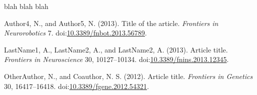 \documentclass{frontiersSCNS} %
\begin{document}
blah blah blah

Author4, N., and Author5, N. (2013). Title of the article.
\emph{Frontiers in Neurorobotics} 7.
doi:\href{http://dx.doi.org/10.3389/fnbot.2013.56789}{10.3389/fnbot.2013.56789}.

LastName1, A., LastName2, A., and LastName2, A. (2013). Article title.
\emph{Frontiers in Neuroscience} 30, 10127--10134.
doi:\href{http://dx.doi.org/10.3389/fnins.2013.12345}{10.3389/fnins.2013.12345}.

OtherAuthor, N., and Coauthor, N. S. (2012). Article title.
\emph{Frontiers in Genetics} 30, 16417--16418.
doi:\href{http://dx.doi.org/10.3389/fgene.2012.54321}{10.3389/fgene.2012.54321}.
\end{document}
